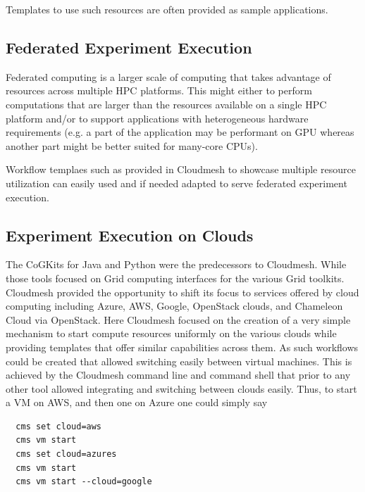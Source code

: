 \documentclass[utf8]{FrontiersinVancouver} %
\begin{document}
Templates to use such resources are often provided as sample applications.

\subsection{Federated Experiment Execution}

Federated computing is a larger scale of computing that takes advantage of resources across multiple HPC platforms. This might either to perform computations that are larger than the resources available on a single HPC platform and/or to support applications with heterogeneous hardware requirements (e.g. a part of the application may be performant on GPU whereas another part might be better suited for many-core CPUs). 

Workflow templaes such as provided in Cloudmesh to showcase multiple resource utilization can easily used and if needed adapted to serve federated experiment execution. 

\subsection{Experiment Execution on Clouds}

The CoGKits for Java and Python were the predecessors to Cloudmesh. While those tools focused on Grid computing interfaces for the various Grid toolkits. Cloudmesh provided the opportunity to shift its focus to services offered by cloud computing including Azure, AWS, Google, OpenStack clouds, and Chameleon Cloud via OpenStack. Here Cloudmesh focused on the creation of a very simple mechanism to start compute resources uniformly on the various clouds while providing templates that offer similar capabilities across them. As such workflows could be created that allowed switching easily between virtual machines. This is achieved by the Cloudmesh command line and command shell that prior to any other tool allowed integrating and switching between clouds easily. Thus, to start a VM on AWS, and then one on Azure one could simply say

\begin{verbatim}
  cms set cloud=aws
  cms vm start
  cms set cloud=azures
  cms vm start
  cms vm start --cloud=google
\end{verbatim}
\end{document}
